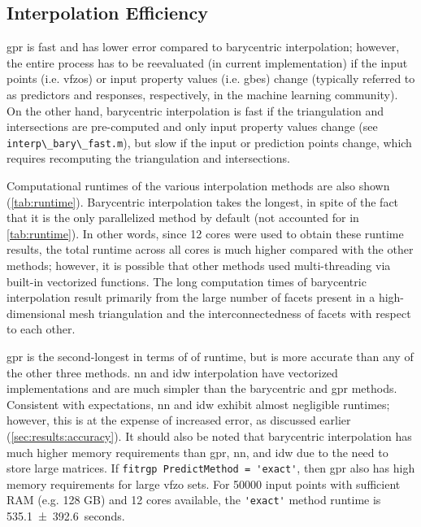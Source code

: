 \documentclass[final,twocolumn,12pt]{elsarticle}
\newcommand{\matlab}[1]{\mbox{\lstinline[style=Matlab-editor]{#1}}}
\newcommand{\inpt}{input}
\newcommand{\outpt}{prediction}
\begin{document}
\subsection{Interpolation Efficiency}
\label{sec:results:efficiency}


\Gls{gpr} is fast and has lower error compared to barycentric interpolation; however, the entire process has to be reevaluated (in current implementation) if the input points (i.e. \glspl{vfzo}) or input property values (i.e. \glspl{gbe}) change
(typically referred to as predictors and responses, respectively, in the machine learning community).
On the other hand, barycentric interpolation is fast if the triangulation and intersections are pre-computed and only input property values change (see \matlab{interp\_bary\_fast.m}), but slow if the \inpt{} or \outpt{} points change, which requires recomputing the triangulation and intersections.

Computational runtimes of the various interpolation methods are also shown (\cref{tab:runtime}). Barycentric interpolation takes the longest, in spite of the fact that it is the only parallelized method by default (not accounted for in \cref{tab:runtime}). In other words, since 12 cores were used to obtain these runtime results, the total runtime across all cores is much higher compared with the other methods; however, it is possible that other methods used multi-threading via built-in vectorized functions. The long computation times of barycentric interpolation result primarily from the large number of facets present in a high-dimensional mesh triangulation and the interconnectedness of facets with respect to each other.

\Gls{gpr} is the second-longest in terms of of runtime, but is more accurate than any of the other three methods. \Gls{nn} and \gls{idw} interpolation have vectorized implementations and are much simpler than the barycentric and \gls{gpr} methods. Consistent with expectations, \gls{nn} and \gls{idw} exhibit almost negligible runtimes; however, this is at the expense of increased error, as discussed earlier (\cref{sec:results:accuracy}). It should also be noted that barycentric interpolation has much higher memory requirements than \gls{gpr}, \gls{nn}, and \gls{idw} due to the need to store large matrices. If \matlab{fitrgp PredictMethod = 'exact'}, then \gls{gpr} also has high memory requirements for large \gls{vfzo} sets. For \num{50000} input points with sufficient RAM (e.g. 128 GB) and 12 cores available, the \matlab{'exact'} method runtime is \SI{535.1 \pm 392.6}{seconds}.
\end{document}
